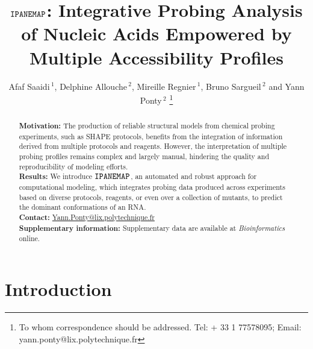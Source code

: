 \documentclass[a4,center,fleqn]{NAR}
\newcommand{\Software}[1]{$\text{\ttfamily #1}$}
\newcommand{\OurTool}{\Software{IPANEMAP}\xspace}
\begin{document}
\title{\OurTool{}:  Integrative Probing Analysis of Nucleic Acids Empowered by Multiple Accessibility Profiles}
\author{%
Afaf Saaidi\,$^{1}$,
Delphine Allouche\,$^{2}$,
Mireille Regnier\,$^{1}$,
Bruno Sargueil\,$^{2}$
and Yann Ponty\,$^2$%
\footnote{To whom correspondence should be addressed.
Tel: + 33 1 77578095; Email: yann.ponty@lix.polytechnique.fr}}


\address{%
$^{1}$CNRS UMR 7161, LIX, Ecole Polytechnique, France
and
$^{2}$CNRS UMR 8015, Laboratoire de cristallographie et RMN Biologiques, University Paris Descartes, France}


\maketitle

\begin{abstract}
\textbf{Motivation:} The production of reliable structural models from chemical probing experiments, such as SHAPE protocols, benefits from the integration of information derived from multiple protocols and reagents. However, the interpretation of multiple probing profiles remains complex and largely manual, hindering the quality and reproducibility of modeling efforts.\\
\textbf{Results:} We introduce \OurTool{}, an automated and robust approach for computational modeling, which integrates probing data produced across experiments based on diverse protocols, reagents, or even over a collection of mutants, to predict the dominant conformations of an RNA.
\\
\textbf{Contact:} \href{yann.ponty@lix.polytechnique.fr}{Yann.Ponty@lix.polytechnique.fr}\\
\textbf{Supplementary information:} Supplementary data are available at \textit{Bioinformatics}
online.
\end{abstract}



\section{Introduction}
\end{document}

